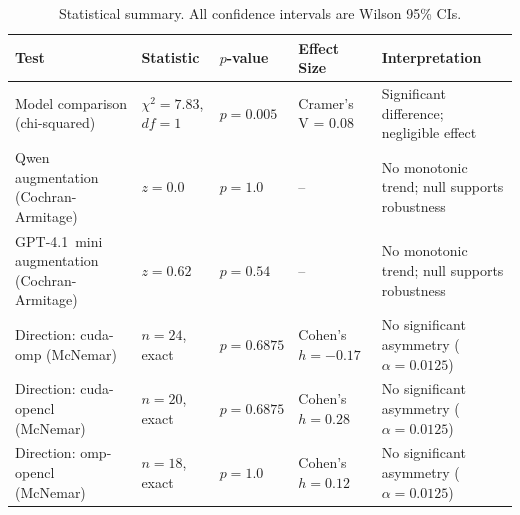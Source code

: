 \begin{table}[htbp]
\centering
\caption{Statistical summary. All confidence intervals are Wilson 95\% CIs.}
\label{tab:stats-summary}
\small
\begin{tabular}{@{}lllll@{}}
\toprule
Test & Statistic & $p$-value & Effect Size & Interpretation \\
\midrule
Model comparison (chi-squared) & $\chi^2 = 7.83$, $df=1$ & $p = 0.005$ & Cramer's V = 0.08 & Significant difference; negligible effect \\ %
Qwen augmentation (Cochran-Armitage) & $z = 0.0$ & $p = 1.0$ & -- & No monotonic trend; null supports robustness \\ %
GPT-4.1~mini augmentation (Cochran-Armitage) & $z = 0.62$ & $p = 0.54$ & -- & No monotonic trend; null supports robustness \\ %
Direction: cuda-omp (McNemar) & $n=24$, exact & $p = 0.6875$ & Cohen's $h = -0.17$ & No significant asymmetry ($\alpha=0.0125$) \\ %
Direction: cuda-opencl (McNemar) & $n=20$, exact & $p = 0.6875$ & Cohen's $h = 0.28$ & No significant asymmetry ($\alpha=0.0125$) \\ %
Direction: omp-opencl (McNemar) & $n=18$, exact & $p = 1.0$ & Cohen's $h = 0.12$ & No significant asymmetry ($\alpha=0.0125$) \\ %
\bottomrule
\end{tabular}
\end{table}



